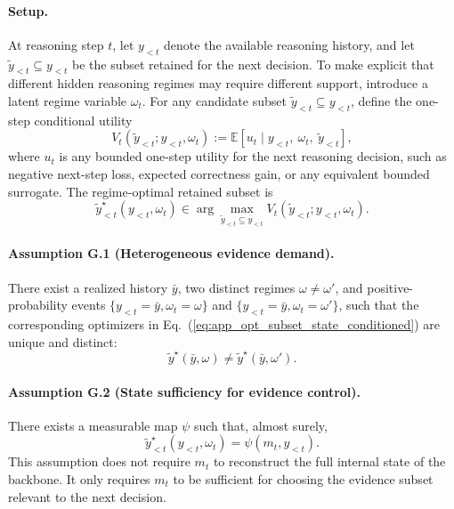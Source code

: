 \paragraph{Setup.}
At reasoning step \(t\), let \(y_{<t}\) denote the available reasoning history, and let
\(\widetilde y_{<t}\subseteq y_{<t}\)
be the subset retained for the next decision.
To make explicit that different hidden reasoning regimes may require different support, introduce a latent regime variable \(\omega_t\).
For any candidate subset \(\widetilde y_{<t}\subseteq y_{<t}\), define the one-step conditional utility
\begin{equation}
V_t(\widetilde y_{<t}; y_{<t}, \omega_t)
:=
\mathbb{E}\!\left[
u_t
\mid
y_{<t},\ \omega_t,\ \widetilde y_{<t}
\right],
\label{eq:app_value_state_conditioned}
\end{equation}
where \(u_t\) is any bounded one-step utility for the next reasoning decision, such as negative next-step loss, expected correctness gain, or any equivalent bounded surrogate.
The regime-optimal retained subset is
\begin{equation}
\widetilde y_{<t}^{\star}(y_{<t},\omega_t)
\in
\arg\max_{\widetilde y_{<t}\subseteq y_{<t}}
V_t(\widetilde y_{<t}; y_{<t}, \omega_t).
\label{eq:app_opt_subset_state_conditioned}
\end{equation}

\paragraph{Assumption G.1 (Heterogeneous evidence demand).}
There exist a realized history \(\bar y\), two distinct regimes \(\omega\neq\omega'\), and positive-probability events
\(\{y_{<t}=\bar y,\omega_t=\omega\}\) and
\(\{y_{<t}=\bar y,\omega_t=\omega'\}\),
such that the corresponding optimizers in Eq.~(\ref{eq:app_opt_subset_state_conditioned}) are unique and distinct:
\begin{equation}
\widetilde y^{\star}(\bar y,\omega)
\neq
\widetilde y^{\star}(\bar y,\omega').
\label{eq:app_assump_hetero_refined}
\end{equation}

\paragraph{Assumption G.2 (State sufficiency for evidence control).}
There exists a measurable map \(\psi\) such that, almost surely,
\begin{equation}
\widetilde y_{<t}^{\star}(y_{<t},\omega_t)
=
\psi(m_t, y_{<t}).
\label{eq:app_assump_sufficient_refined}
\end{equation}
This assumption does not require \(m_t\) to reconstruct the full internal state of the backbone.
It only requires \(m_t\) to be sufficient for choosing the evidence subset relevant to the next decision.

